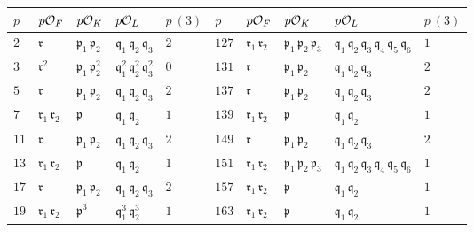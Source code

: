 \begin{figure}
  \begin{center}
    \renewcommand{\arraystretch}{1.5}
    \begin{tabular}{x{0.75cm}x{1cm}x{1.25cm}x{2.5cm}x{0.75cm}x{0.75cm}x{1cm}x{1.25cm}x{2.5cm}x{0.75cm}}
      $p$ & $p\mathcal{O}_F$ & $p\mathcal{O}_K$ & $p\mathcal{O}_L$ & $p~(3)$ & $p$ & $p\mathcal{O}_F$ & $p\mathcal{O}_K$ & $p\mathcal{O}_L$ & $p~(3)$ \tabularnewline
      \hline
      $2$ & $\mathfrak{r}$ & $\mathfrak{p}_1\,\mathfrak{p}_2$ & $\mathfrak{q}_1\,\mathfrak{q}_2\,\mathfrak{q}_3$ & $2$ & $127$ & $\mathfrak{r}_1\,\mathfrak{r}_2$ & $\mathfrak{p}_1\,\mathfrak{p}_2\,\mathfrak{p}_3$ & $\mathfrak{q}_1\,\mathfrak{q}_2\,\mathfrak{q}_3\,\mathfrak{q}_4\,\mathfrak{q}_5\,\mathfrak{q}_6$ & $1$ \tabularnewline
      \hline
      $3$ & $\mathfrak{r}^2$ & $\mathfrak{p}_1\,\mathfrak{p}_2^2$ & $\mathfrak{q}_1^2\,\mathfrak{q}_2^2\,\mathfrak{q}_3^2$ & $0$ & $131$ & $\mathfrak{r}$ & $\mathfrak{p}_1\,\mathfrak{p}_2$ & $\mathfrak{q}_1\,\mathfrak{q}_2\,\mathfrak{q}_3$ & $2$ \tabularnewline
      \hline
      $5$ & $\mathfrak{r}$ & $\mathfrak{p}_1\,\mathfrak{p}_2$ & $\mathfrak{q}_1\,\mathfrak{q}_2\,\mathfrak{q}_3$ & $2$ & $137$ & $\mathfrak{r}$ & $\mathfrak{p}_1\,\mathfrak{p}_2$ & $\mathfrak{q}_1\,\mathfrak{q}_2\,\mathfrak{q}_3$ & $2$ \tabularnewline
      \hline
      $7$ & $\mathfrak{r}_1\,\mathfrak{r}_2$ & $\mathfrak{p}$ & $\mathfrak{q}_1\,\mathfrak{q}_2$ & $1$ & $139$ & $\mathfrak{r}_1\,\mathfrak{r}_2$ & $\mathfrak{p}$ & $\mathfrak{q}_1\,\mathfrak{q}_2$ & $1$ \tabularnewline
      \hline
      $11$ & $\mathfrak{r}$ & $\mathfrak{p}_1\,\mathfrak{p}_2$ & $\mathfrak{q}_1\,\mathfrak{q}_2\,\mathfrak{q}_3$ & $2$ & $149$ & $\mathfrak{r}$ & $\mathfrak{p}_1\,\mathfrak{p}_2$ & $\mathfrak{q}_1\,\mathfrak{q}_2\,\mathfrak{q}_3$ & $2$ \tabularnewline
      \hline
      $13$ & $\mathfrak{r}_1\,\mathfrak{r}_2$ & $\mathfrak{p}$ & $\mathfrak{q}_1\,\mathfrak{q}_2$ & $1$ & $151$ & $\mathfrak{r}_1\,\mathfrak{r}_2$ & $\mathfrak{p}_1\,\mathfrak{p}_2\,\mathfrak{p}_3$ & $\mathfrak{q}_1\,\mathfrak{q}_2\,\mathfrak{q}_3\,\mathfrak{q}_4\,\mathfrak{q}_5\,\mathfrak{q}_6$ & $1$ \tabularnewline
      \hline
      $17$ & $\mathfrak{r}$ & $\mathfrak{p}_1\,\mathfrak{p}_2$ & $\mathfrak{q}_1\,\mathfrak{q}_2\,\mathfrak{q}_3$ & $2$ & $157$ & $\mathfrak{r}_1\,\mathfrak{r}_2$ & $\mathfrak{p}$ & $\mathfrak{q}_1\,\mathfrak{q}_2$ & $1$ \tabularnewline
      \hline
      $19$ & $\mathfrak{r}_1\,\mathfrak{r}_2$ & $\mathfrak{p}^3$ & $\mathfrak{q}_1^3\,\mathfrak{q}_2^3$ & $1$ & $163$ & $\mathfrak{r}_1\,\mathfrak{r}_2$ & $\mathfrak{p}$ & $\mathfrak{q}_1\,\mathfrak{q}_2$ & $1$ \tabularnewline

\end{tabular}
\end{center}
\end{figure}
